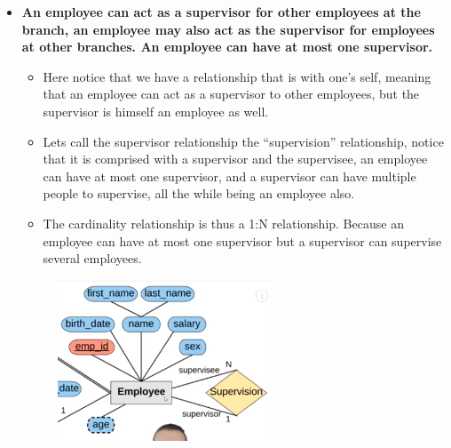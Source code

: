 \begin{itemize}
    \item \textbf{An employee can act as a supervisor for other employees at the branch, an employee may also act as the supervisor for employees at other branches. An employee can have at most one supervisor.}
        \begin{itemize}
            \item Here notice that we have a relationship that is with one's self, meaning that an employee can act as a supervisor to other employees, but the supervisor is himself an employee as well.
            \item Lets call the supervisor relationship the ``supervision'' relationship, notice that it is comprised with a supervisor and the supervisee, an employee can have at most one supervisor, and a supervisor can have multiple people to supervise, all the while being an employee also.
            \item The cardinality relationship is thus a 1:N relationship. Because an employee can have at most one supervisor but a supervisor can supervise several employees.
        \end{itemize}
        \begin{figure}[H]
            \centering
            \includegraphics[width=0.6\textwidth]{./Figs/2020-12-24-00-32-14.png}
        \end{figure}
    

\end{itemize}
